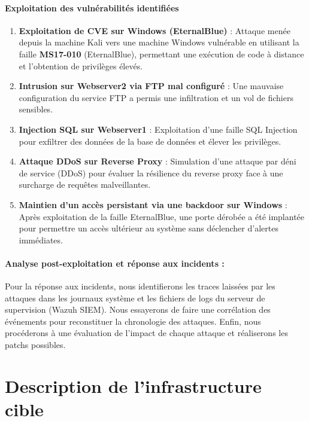 \documentclass[a4paper,12pt]{report}
\begin{document}
\paragraph{Exploitation des vuln\'erabilit\'es identifi\'ees}
\begin{enumerate}
    \item \textbf{Exploitation de CVE sur Windows (EternalBlue)} : Attaque men\'ee depuis la machine Kali vers une machine Windows vuln\'erable en utilisant la faille \textbf{MS17-010} (EternalBlue), permettant une ex\'ecution de code \`a distance et l’obtention de privil\`eges \'elev\'es.
    \item \textbf{Intrusion sur Webserver2 via FTP mal configur\'e} : Une mauvaise configuration du service FTP a permis une infiltration et un vol de fichiers sensibles.
    \item \textbf{Injection SQL sur Webserver1} : Exploitation d’une faille SQL Injection pour exfiltrer des donn\'ees de la base de donn\'ees et  \'elever les privil\`eges.
    \item \textbf{Attaque DDoS sur Reverse Proxy} : Simulation d’une attaque par d\'eni de service (DDoS) pour \'evaluer la r\'esilience du reverse proxy face \`a une surcharge de requ\^etes malveillantes.
    \item \textbf{Maintien d’un acc\`es persistant via une backdoor sur Windows} : Apr\`es exploitation de la faille EternalBlue, une porte d\'erob\'ee a \'et\'e implant\'ee pour permettre un acc\`es ult\'erieur au syst\`eme sans d\'eclencher d’alertes imm\'ediates.
\end{enumerate}

\paragraph{Analyse post-exploitation et r\'eponse aux incidents : }
Pour la réponse aux incidents, nous identifierons les traces laissées par les attaques dans les journaux syst\`eme et les fichiers de logs du serveur de supervision (Wazuh SIEM).
   Nous essayerons de faire une corr\'elation des \'ev\'enements pour reconstituer la chronologie des attaques.
    Enfin, nous procéderons à une évaluation de l’impact de chaque attaque et réaliserons les patchs possibles.


\section{Description de l'infrastructure cible}
\end{document}
